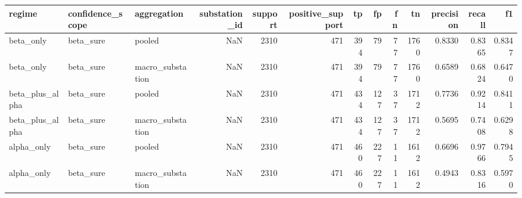 \begin{tabular}{lllrrrrrrrrrr}
\toprule
regime & confidence_scope & aggregation & substation_id & support & positive_support & tp & fp & fn & tn & precision & recall & f1 \\
\midrule
beta_only & beta_sure & pooled & NaN & 2310 & 471 & 394 & 79 & 77 & 1760 & 0.8330 & 0.8365 & 0.8347 \\
beta_only & beta_sure & macro_substation & NaN & 2310 & 471 & 394 & 79 & 77 & 1760 & 0.6589 & 0.6824 & 0.6470 \\
beta_plus_alpha & beta_sure & pooled & NaN & 2310 & 471 & 434 & 127 & 37 & 1712 & 0.7736 & 0.9214 & 0.8411 \\
beta_plus_alpha & beta_sure & macro_substation & NaN & 2310 & 471 & 434 & 127 & 37 & 1712 & 0.5695 & 0.7408 & 0.6298 \\
alpha_only & beta_sure & pooled & NaN & 2310 & 471 & 460 & 227 & 11 & 1612 & 0.6696 & 0.9766 & 0.7945 \\
alpha_only & beta_sure & macro_substation & NaN & 2310 & 471 & 460 & 227 & 11 & 1612 & 0.4943 & 0.8316 & 0.5970 \\
\bottomrule
\end{tabular}
